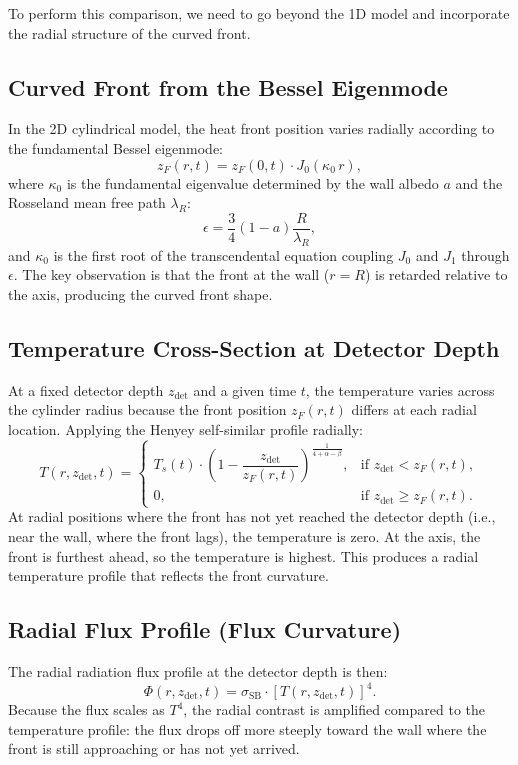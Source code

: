 \documentclass{article}
\begin{document}
To perform this comparison, we need to go beyond the 1D model and incorporate the radial structure of the curved front.

\subsection{Curved Front from the Bessel Eigenmode}
In the 2D cylindrical model, the heat front position varies radially according to the fundamental Bessel eigenmode:
\begin{equation}
z_F(r, t) = z_F(0, t) \cdot J_0(\kappa_0 \, r),
\end{equation}
where $\kappa_0$ is the fundamental eigenvalue determined by the wall albedo $a$ and the Rosseland mean free path $\lambda_R$:
\begin{equation}
\epsilon = \frac{3}{4} (1 - a) \frac{R}{\lambda_R},
\end{equation}
and $\kappa_0$ is the first root of the transcendental equation coupling $J_0$ and $J_1$ through $\epsilon$. The key observation is that the front at the wall ($r = R$) is retarded relative to the axis, producing the curved front shape.

\subsection{Temperature Cross-Section at Detector Depth}
At a fixed detector depth $z_{\text{det}}$ and a given time $t$, the temperature varies across the cylinder radius because the front position $z_F(r, t)$ differs at each radial location. Applying the Henyey self-similar profile radially:
\begin{equation}
\label{eq:T_radial}
T(r, z_{\text{det}}, t) = 
\begin{cases}
T_s(t) \cdot \left( 1 - \dfrac{z_{\text{det}}}{z_F(r, t)} \right)^{\frac{1}{4+\alpha-\beta}}, & \text{if } z_{\text{det}} < z_F(r, t), \\[6pt]
0, & \text{if } z_{\text{det}} \ge z_F(r, t).
\end{cases}
\end{equation}
At radial positions where the front has not yet reached the detector depth (i.e., near the wall, where the front lags), the temperature is zero. At the axis, the front is furthest ahead, so the temperature is highest. This produces a radial temperature profile that reflects the front curvature.

\subsection{Radial Flux Profile (Flux Curvature)}
The radial radiation flux profile at the detector depth is then:
\begin{equation}
\Phi(r, z_{\text{det}}, t) = \sigma_{\text{SB}} \cdot \left[ T(r, z_{\text{det}}, t) \right]^4.
\end{equation}
Because the flux scales as $T^4$, the radial contrast is amplified compared to the temperature profile: the flux drops off more steeply toward the wall where the front is still approaching or has not yet arrived.
\end{document}
